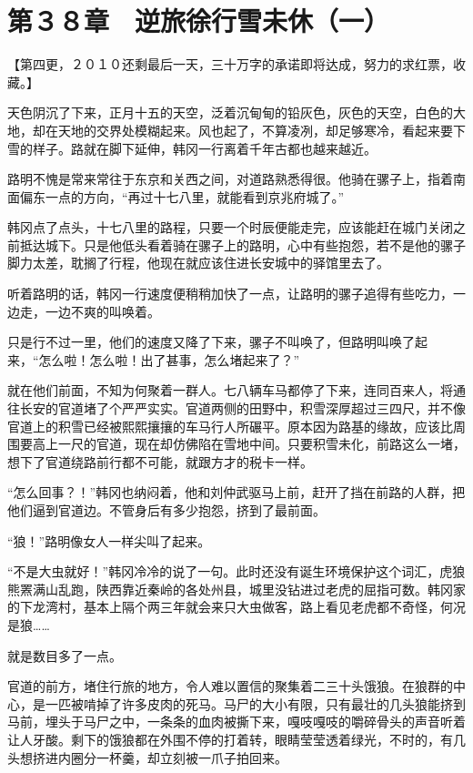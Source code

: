 \section{第３８章　逆旅徐行雪未休（一）}

【第四更，２０１０还剩最后一天，三十万字的承诺即将达成，努力的求红票，收藏。】

天色阴沉了下来，正月十五的天空，泛着沉甸甸的铅灰色，灰色的天空，白色的大地，却在天地的交界处模糊起来。风也起了，不算凌冽，却足够寒冷，看起来要下雪的样子。路就在脚下延伸，韩冈一行离着千年古都也越来越近。

路明不愧是常来常往于东京和关西之间，对道路熟悉得很。他骑在骡子上，指着南面偏东一点的方向，“再过十七八里，就能看到京兆府城了。”

韩冈点了点头，十七八里的路程，只要一个时辰便能走完，应该能赶在城门关闭之前抵达城下。只是他低头看着骑在骡子上的路明，心中有些抱怨，若不是他的骡子脚力太差，耽搁了行程，他现在就应该住进长安城中的驿馆里去了。

听着路明的话，韩冈一行速度便稍稍加快了一点，让路明的骡子追得有些吃力，一边走，一边不爽的叫唤着。

只是行不过一里，他们的速度又降了下来，骡子不叫唤了，但路明叫唤了起来，“怎么啦！怎么啦！出了甚事，怎么堵起来了？”

就在他们前面，不知为何聚着一群人。七八辆车马都停了下来，连同百来人，将通往长安的官道堵了个严严实实。官道两侧的田野中，积雪深厚超过三四尺，并不像官道上的积雪已经被熙熙攘攘的车马行人所碾平。原本因为路基的缘故，应该比周围要高上一尺的官道，现在却仿佛陷在雪地中间。只要积雪未化，前路这么一堵，想下了官道绕路前行都不可能，就跟方才的税卡一样。

“怎么回事？！”韩冈也纳闷着，他和刘仲武驱马上前，赶开了挡在前路的人群，把他们逼到官道边。不管身后有多少抱怨，挤到了最前面。

“狼！”路明像女人一样尖叫了起来。

“不是大虫就好！”韩冈冷冷的说了一句。此时还没有诞生环境保护这个词汇，虎狼熊罴满山乱跑，陕西靠近秦岭的各处州县，城里没钻进过老虎的屈指可数。韩冈家的下龙湾村，基本上隔个两三年就会来只大虫做客，路上看见老虎都不奇怪，何况是狼……

就是数目多了一点。

官道的前方，堵住行旅的地方，令人难以置信的聚集着二三十头饿狼。在狼群的中心，是一匹被啃掉了许多皮肉的死马。马尸的大小有限，只有最壮的几头狼能挤到马前，埋头于马尸之中，一条条的血肉被撕下来，嘎吱嘎吱的嚼碎骨头的声音听着让人牙酸。剩下的饿狼都在外围不停的打着转，眼睛莹莹透着绿光，不时的，有几头想挤进内圈分一杯羹，却立刻被一爪子拍回来。

